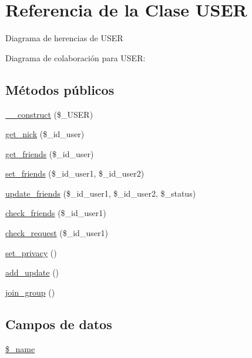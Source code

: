 \hypertarget{class_u_s_e_r}{\section{Referencia de la Clase U\-S\-E\-R}
\label{class_u_s_e_r}
}


Diagrama de herencias de U\-S\-E\-R


Diagrama de colaboración para U\-S\-E\-R\-:
\subsection*{Métodos públicos}
\begin{DoxyCompactItemize}
\item 
\hyperlink{class_u_s_e_r_a15892f146e6b2027d102f45066962756}{\-\_\-\-\_\-construct} (\$\-\_\-\-U\-S\-E\-R)
\item 
\hyperlink{class_u_s_e_r_ab27eae3cc546c0d1cca53dd8258df2ca}{get\-\_\-nick} (\$\-\_\-id\-\_\-user)
\item 
\hyperlink{class_u_s_e_r_a6dc3b26d0815f3e58f04026461a24e3d}{get\-\_\-friends} (\$\-\_\-id\-\_\-user)
\item 
\hyperlink{class_u_s_e_r_a51af8580bd838eadf87f1d2a34815f60}{set\-\_\-friends} (\$\-\_\-id\-\_\-user1, \$\-\_\-id\-\_\-user2)
\item 
\hyperlink{class_u_s_e_r_ad71576bbcc6b8a74764136e23a64cc43}{update\-\_\-friends} (\$\-\_\-id\-\_\-user1, \$\-\_\-id\-\_\-user2, \$\-\_\-status)
\item 
\hyperlink{class_u_s_e_r_a1ed467f3e4b822d4e18c12542ea7be41}{check\-\_\-friends} (\$\-\_\-id\-\_\-user1)
\item 
\hyperlink{class_u_s_e_r_a90fc06b83a1b3db2837ec1c7c8b14d34}{check\-\_\-request} (\$\-\_\-id\-\_\-user1)
\item 
\hyperlink{class_u_s_e_r_a91094b4a3203c555d956b8452d61ce3b}{set\-\_\-privacy} ()
\item 
\hyperlink{class_u_s_e_r_a08eee4c38fa6195185760f885c3184a6}{add\-\_\-update} ()
\item 
\hyperlink{class_u_s_e_r_ab2863ad83c3399cd62a792e226b64697}{join\-\_\-group} ()
\end{DoxyCompactItemize}
\subsection*{Campos de datos}
\begin{DoxyCompactItemize}
\item 
\hyperlink{class_u_s_e_r_a1c89defaf5aa7ac8e526065e8572f580}{\$\-\_\-name}
\end{DoxyCompactItemize}
